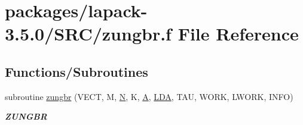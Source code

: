 \hypertarget{zungbr_8f}{}\section{packages/lapack-\/3.5.0/\+S\+R\+C/zungbr.f File Reference}
\label{zungbr_8f}
\subsection*{Functions/\+Subroutines}
\begin{DoxyCompactItemize}
\item 
subroutine \hyperlink{group__complex16GBcomputational_ga5cb4b9d353cfd24bd8862e8f2a845edb}{zungbr} (V\+E\+C\+T, M, \hyperlink{polmisc_8c_a0240ac851181b84ac374872dc5434ee4}{N}, K, \hyperlink{classA}{A}, \hyperlink{example__user_8c_ae946da542ce0db94dced19b2ecefd1aa}{L\+D\+A}, T\+A\+U, W\+O\+R\+K, L\+W\+O\+R\+K, I\+N\+F\+O)
\begin{DoxyCompactList}\small\item\em {\bfseries Z\+U\+N\+G\+B\+R} \end{DoxyCompactList}\end{DoxyCompactItemize}
